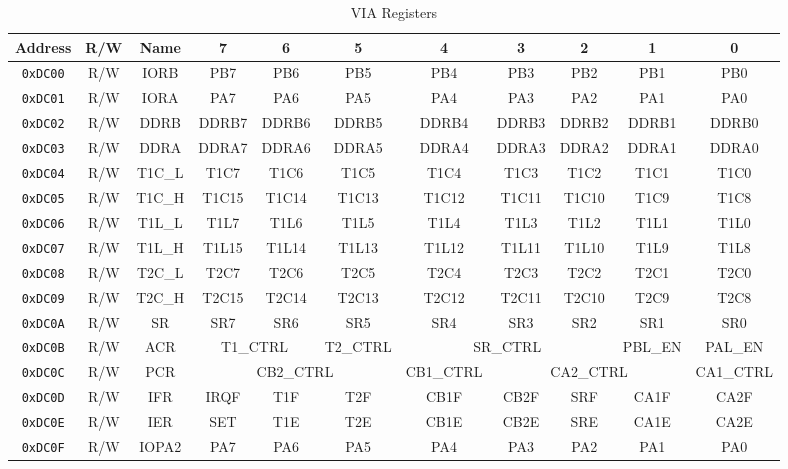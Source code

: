 \begin{table}[ht]
    \begin{center}
        \begin{tabular}{|c|c|c|c|c|c|c|c|c|c|c|} \hline
            Address & R/W & Name & 7 & 6 & 5 & 4 & 3 & 2 & 1 & 0 \\\hline\hline
            \verb+0xDC00+ & R/W & IORB & PB7 & PB6 & PB5 & PB4 & PB3 & PB2 & PB1 & PB0 \\ \hline
            \verb+0xDC01+ & R/W & IORA & PA7 & PA6 & PA5 & PA4 & PA3 & PA2 & PA1 & PA0 \\ \hline
            \verb+0xDC02+ & R/W & DDRB & DDRB7 & DDRB6 & DDRB5 & DDRB4 & DDRB3 & DDRB2 & DDRB1 & DDRB0 \\ \hline
            \verb+0xDC03+ & R/W & DDRA & DDRA7 & DDRA6 & DDRA5 & DDRA4 & DDRA3 & DDRA2 & DDRA1 & DDRA0 \\ \hline
            \verb+0xDC04+ & R/W & T1C\_L & T1C7 & T1C6 & T1C5 & T1C4 & T1C3 & T1C2 & T1C1 & T1C0 \\ \hline
            \verb+0xDC05+ & R/W & T1C\_H & T1C15 & T1C14 & T1C13 & T1C12 & T1C11 & T1C10 & T1C9 & T1C8 \\ \hline
            \verb+0xDC06+ & R/W & T1L\_L & T1L7 & T1L6 & T1L5 & T1L4 & T1L3 & T1L2 & T1L1 & T1L0 \\ \hline
            \verb+0xDC07+ & R/W & T1L\_H & T1L15 & T1L14 & T1L13 & T1L12 & T1L11 & T1L10 & T1L9 & T1L8 \\ \hline
            \verb+0xDC08+ & R/W & T2C\_L & T2C7 & T2C6 & T2C5 & T2C4 & T2C3 & T2C2 & T2C1 & T2C0 \\ \hline
            \verb+0xDC09+ & R/W & T2C\_H & T2C15 & T2C14 & T2C13 & T2C12 & T2C11 & T2C10 & T2C9 & T2C8\\ \hline
            \verb+0xDC0A+ & R/W & SR & SR7 & SR6 & SR5 & SR4 & SR3 & SR2 & SR1 & SR0 \\ \hline
            \verb+0xDC0B+ & R/W & ACR & \multicolumn{2}{|c|}{T1\_CTRL} & T2\_CTRL & \multicolumn{3}{|c|}{SR\_CTRL} & PBL\_EN & PAL\_EN \\ \hline
            \verb+0xDC0C+ & R/W & PCR & \multicolumn{3}{|c|}{CB2\_CTRL} & CB1\_CTRL & \multicolumn{3}{|c|}{CA2\_CTRL} & CA1\_CTRL \\ \hline
            \verb+0xDC0D+ & R/W & IFR & IRQF & T1F & T2F & CB1F & CB2F & SRF & CA1F & CA2F \\ \hline
            \verb+0xDC0E+ & R/W & IER & SET & T1E & T2E & CB1E & CB2E & SRE & CA1E & CA2E \\ \hline
            \verb+0xDC0F+ & R/W & IOPA2 & PA7 & PA6 & PA5 & PA4 & PA3 & PA2 & PA1 & PA0 \\ \hline
        \end{tabular}
    \end{center}
    \caption{VIA Registers}
    \label{tab:via_reg}
\end{table}


